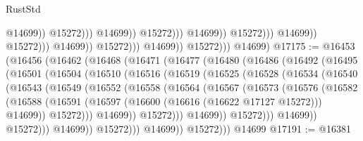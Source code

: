 \begin{lexlean}{RustStd}
\begin{coremodule}
                                                                  @14699))
                                                              @15272)))
                                                        @14699))
                                                    @15272)))
                                              @14699))
                                          @15272)))
                                    @14699))
                                @15272)))
                          @14699))
                      @15272)))
                @14699))
            @15272)))
      @14699)
@17175 := @16453
    (@16456
      (@16462
        (@16468
          (@16471
            (@16477
              (@16480
                (@16486
                  (@16492
                    (@16495
                      (@16501
                        (@16504
                          (@16510
                            (@16516
                              (@16519
                                (@16525
                                  (@16528
                                    (@16534
                                      (@16540
                                        (@16543
                                          (@16549
                                            (@16552
                                              (@16558
                                                (@16564
                                                  (@16567
                                                    (@16573
                                                      (@16576
                                                        (@16582
                                                          (@16588
                                                            (@16591
                                                              (@16597
                                                                (@16600
                                                                  (@16616 (@16622 @17127 @15272)))
                                                                @14699))
                                                            @15272)))
                                                      @14699))
                                                  @15272)))
                                            @14699))
                                        @15272)))
                                  @14699))
                              @15272)))
                        @14699))
                    @15272)))
              @14699))
          @15272)))
    @14699
@17191 := @16381

\end{coremodule}
\end{lexlean}
